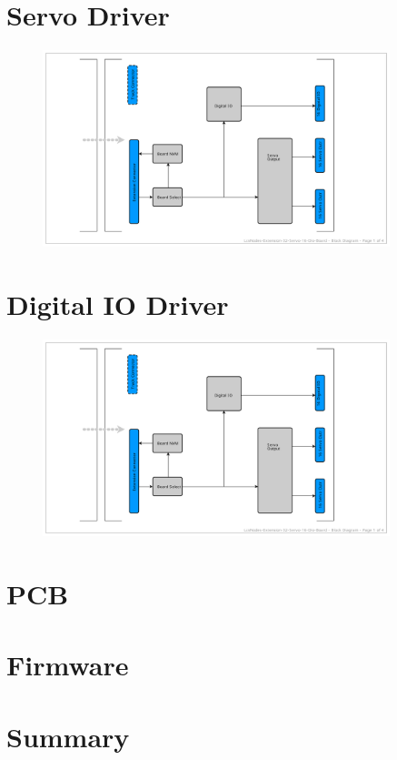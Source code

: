 \section{Servo Driver}

\begin{figure}[htbp]
    \centering
    \includegraphics[page=3, width=0.9\textwidth]{./Schematics/Schematic_LcsNodes-Extension-32-Servo-16-Dio-Board.pdf}
\end{figure}
\FloatBarrier

\section{Digital IO Driver}

\begin{figure}[htbp]
    \centering
    \includegraphics[page=4, width=0.9\textwidth]{./Schematics/Schematic_LcsNodes-Extension-32-Servo-16-Dio-Board.pdf}
\end{figure}
\FloatBarrier

\section{PCB}


\section{Firmware}

\section{Summary}
